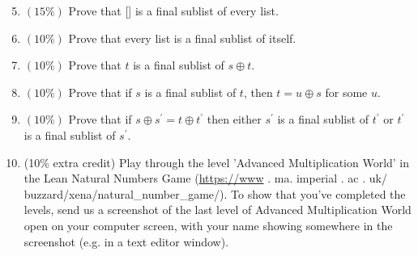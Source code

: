 \documentclass[10pt]{article}
\begin{document}
\begin{enumerate}
  \setcounter{enumi}{4}
  \item $(15 \%)$ Prove that [] is a final sublist of every list.

  \item $(10 \%)$ Prove that every list is a final sublist of itself.

  \item $(10 \%)$ Prove that $t$ is a final sublist of $s \oplus t$.

  \item $(10 \%)$ Prove that if $s$ is a final sublist of $t$, then $t=u \oplus s$ for some $u$.

  \item $(10 \%)$ Prove that if $s \oplus s^{\prime}=t \oplus t^{\prime}$ then either $s^{\prime}$ is a final sublist of $t^{\prime}$ or $t^{\prime}$ is a final sublist of $s^{\prime}$.

  \item (10\% extra credit) Play through the level 'Advanced Multiplication World' in the Lean Natural Numbers Game (\href{https://www}{https://www} . ma. imperial . ac . uk/ buzzard/xena/natural\_number\_game/). To show that you've completed the levels, send us a screenshot of the last level of Advanced Multiplication World open on your computer screen, with your name showing somewhere in the screenshot (e.g. in a text editor window).

\end{enumerate}
\end{document}
